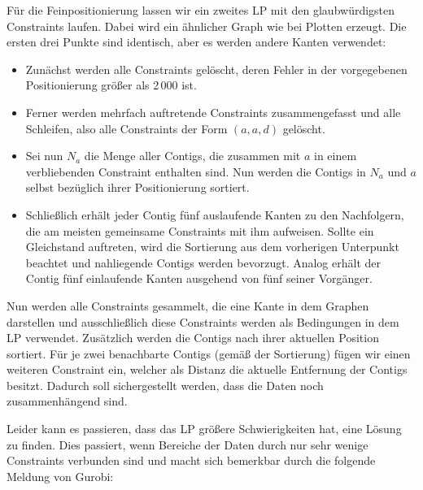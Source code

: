 Für die Feinpositionierung lassen wir ein zweites LP mit den glaubwürdigsten Constraints laufen. Dabei wird ein ähnlicher Graph wie bei Plotten erzeugt. Die ersten drei Punkte sind identisch, aber es werden andere Kanten verwendet:
\begin{itemize}
	\item Zunächst werden alle Constraints gelöscht, deren Fehler in der vorgegebenen Positionierung größer als 2\,000 ist.
	\item Ferner werden mehrfach auftretende Constraints zusammengefasst und alle Schleifen, also alle Constraints der Form $(a, a, d)$ gelöscht.
	\item Sei nun $N_a$ die Menge aller Contigs, die zusammen mit $a$ in einem verbliebenden Constraint enthalten sind. Nun werden die Contigs in $N_a$ und $a$ selbst bezüglich ihrer Positionierung sortiert.
	\item Schließlich erhält jeder Contig fünf auslaufende Kanten zu den Nachfolgern, die am meisten gemeinsame Constraints mit ihm aufweisen. Sollte ein Gleichstand auftreten, wird die Sortierung aus dem vorherigen Unterpunkt beachtet und nahliegende Contigs werden bevorzugt. Analog erhält der Contig fünf einlaufende Kanten ausgehend von fünf seiner Vorgänger.
\end{itemize}
Nun werden alle Constraints gesammelt, die eine Kante in dem Graphen darstellen und ausschließlich diese Constraints werden als Bedingungen in dem LP verwendet.
Zusätzlich werden die Contigs nach ihrer aktuellen Position sortiert. Für je zwei benachbarte Contigs (gemäß der Sortierung) fügen wir einen weiteren Constraint ein, welcher als Distanz die aktuelle Entfernung der Contigs besitzt. Dadurch soll sichergestellt werden, dass die Daten noch zusammenhängend sind.

Leider kann es passieren, dass das LP größere Schwierigkeiten hat, eine Lösung zu finden. Dies passiert, wenn Bereiche der Daten durch nur sehr wenige Constraints verbunden sind und macht sich bemerkbar durch die folgende Meldung von Gurobi: 

